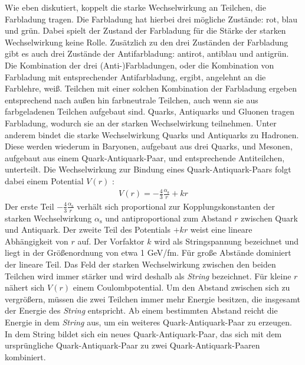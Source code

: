 Wie eben diskutiert, koppelt die starke Wechselwirkung an Teilchen, die Farbladung tragen.
Die Farbladung hat hierbei drei mögliche Zustände: rot, blau und grün.
Dabei spielt der Zustand der Farbladung für die Stärke der starken Wechselwirkung keine Rolle.
Zusätzlich zu den drei Zuständen der Farbladung gibt es auch drei Zustände der Antifarbladung: antirot, antiblau und antigrün.
\newline
Die Kombination der drei (Anti-)Farbladungen, oder die Kombination von Farbladung mit ent\-spre\-chender Antifarbladung, ergibt, angelehnt an die Farblehre, weiß.
Teilchen mit einer solchen Kombination der Farbladung ergeben entsprechend nach außen hin farbneutrale Teilchen, auch wenn sie aus farbgeladenen Teilchen aufgebaut sind.
\newline
Quarks, Antiquarks und Gluonen tragen Farbladung, wodurch sie an der starken Wechselwirkung teilnehmen.
Unter anderem bindet die starke Wechselwirkung Quarks und Antiquarks zu  Hadronen.
Diese werden wiederum in  Baryonen, aufgebaut aus drei Quarks, und  Mesonen, aufgebaut aus einem Quark-Antiquark-Paar, und entsprechende Antiteilchen, unterteilt.
\newline
Die Wechselwirkung zur Bindung eines Quark-Antiquark-Paars folgt dabei einem Potential $V(r)$ \cite{script:kt1}:
\begin{align} \label{eq:Potential}
V(r) = -\frac{4}{3}\frac{\alpha_\text{s}}{r} + kr 
\end{align}
Der erste Teil $-\frac{4}{3}\frac{\alpha_\text{s}}{r}$ verhält sich proportional zur  Kopplungskonstanten der starken Wechselwirkung $\alpha_{\text{s}}$ und antiproportional zum Abstand $r$ zwischen Quark und Antiquark.
\newline
Der zweite Teil des Potentials $+kr$ weist eine lineare Abhängigkeit von $r$ auf.
Der Vorfaktor $k$ wird als Stringspannung bezeichnet und liegt in der Größenordnung von etwa 1 GeV/fm.
Für große Abstände dominiert der lineare Teil.
Das Feld der starken Wechselwirkung zwischen den beiden Teilchen wird immer stärker und wird deshalb als \textit{String} bezeichnet.
Für kleine $r$ nähert sich $V(r)$ einem Coulombpotential.
\newline
Um den Abstand zwischen sich zu vergrößern, müssen die zwei Teilchen immer mehr Energie besitzen, die insgesamt der Energie des \textit{String} entspricht.
Ab einem bestimmten Abstand reicht die Energie in dem \textit{String} aus, um ein weiteres Quark-Antiquark-Paar zu erzeugen.
In dem String bildet sich ein neues Quark-Antiquark-Paar, das sich mit dem ursprüngliche Quark-Antiquark-Paar zu zwei Quark-Antiquark-Paaren kombiniert.
